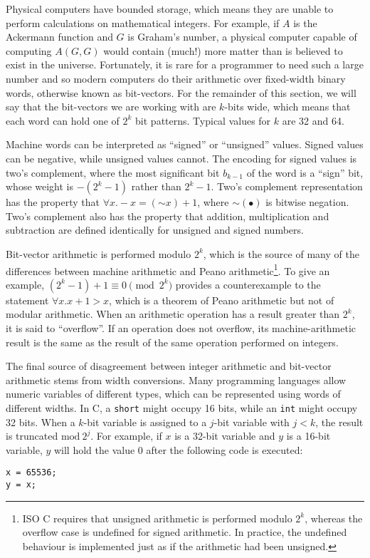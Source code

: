\documentclass[preprint]{sigplanconf}
\theoremstyle{definition}
\begin{document}
Physical computers have bounded storage, which means they are unable to
perform calculations on mathematical integers.  For example, if $A$ is the
Ackermann function and $G$ is Graham's number, a physical computer capable
of computing $A(G, G)$ would contain (much!) more matter than is believed to
exist in the universe.  Fortunately, it is rare for a programmer to need
such a large number and so modern computers do their arithmetic over
fixed-width binary words, otherwise known as bit-vectors.  For the remainder
of this section, we will say that the bit-vectors we are working with are
$k$-bits wide, which means that each word can hold one of $2^k$ bit
patterns.  Typical values for $k$ are 32 and 64.

Machine words can be interpreted as ``signed'' or ``unsigned'' values. 
Signed values can be negative, while unsigned values cannot.  The encoding
for signed values is two's complement, where the most significant bit
$b_{k-1}$ of the word is a ``sign'' bit, whose weight is $-(2^k - 1)$ rather
than $2^k - 1$.  Two's complement representation has the property that
$\forall x .  -x = (\mathord{\sim} x) + 1$, where $\mathord{\sim}(\bullet)$
is bitwise negation.  Two's complement also has the property that addition,
multiplication and subtraction are defined identically for unsigned and
signed numbers.

Bit-vector arithmetic is performed modulo $2^k$, which is the source of many
of the differences between machine arithmetic and Peano
arithmetic\footnote{ISO C requires that unsigned arithmetic is performed
modulo $2^k$, whereas the overflow case is undefined for signed arithmetic. 
In practice, the undefined behaviour is implemented just as if the
arithmetic had been unsigned.}.  To give an example, $(2^k - 1) + 1 \equiv 0
\pmod {2^k}$ provides a counterexample to the statement $\forall x. 
x + 1 > x$, which is a theorem of Peano arithmetic but not of modular
arithmetic.  When an arithmetic operation has a result greater than $2^k$,
it is said to ``overflow''.  If an operation does not overflow, its
machine-arithmetic result is the same as the result of the same operation
performed on integers.

The final source of disagreement between integer arithmetic and bit-vector
arithmetic stems from width conversions.  Many programming languages allow
numeric variables of different types, which can be represented using words
of different widths.  In C, a \texttt{short} might occupy 16 bits, while an
\texttt{int} might occupy 32 bits.  When a $k$-bit variable is assigned to a
$j$-bit variable with $j < k$, the result is truncated $\mathrm{mod}~2^j$.  For
example, if $x$ is a 32-bit variable and $y$ is a 16-bit variable, $y$ will
hold the value $0$ after the following code is executed:
%
\begin{lstlisting}
x = 65536;
y = x;
\end{lstlisting}
\end{document}
